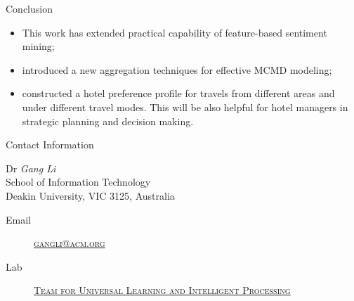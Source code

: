 \documentclass[
 size=12pt,
 paper=smartboard, %
 mode=present, %
 display=slides, %
 style=tulip,  %
 pauseslide,
 fleqn,leqno,clock]{powerdot}
\begin{document}
\begin{slide}[toc=,bm=]{Conclusion}
\begin{itemize}
\item This work has extended practical capability of feature-based sentiment mining; \pause

\item introduced a new aggregation techniques for effective MCMD modeling; \pause
 
\item constructed a hotel preference profile for travels from different areas and under different travel modes.
This will be also helpful for hotel managers in strategic planning and decision making.
\end{itemize}
\pause
\begin{center}
\textcolor{red}{\scalebox{1.5}{Questions?}}
\end{center}
\end{slide}


\begin{wideslide}[toc=,bm=]{Contact Information}
\centering
{}
\twocolumn[
lcolwidth=0.35\linewidth,
rcolwidth=0.65\linewidth
]
{
}
{
Dr \emph{Gang Li}\\
School of Information Technology\\
Deakin University, VIC 3125, Australia
\begin{description}
 \item[Email] \href{mailto:gangli@acm.org}
 {\textsc{\footnotesize{gangli@acm.org}}}
 
 \item[Lab] \href{http://www.tulip.org.au}
 {\textsc{\footnotesize{Team for Universal Learning and Intelligent Processing}}} 
\end{description}
} 
\end{wideslide}
\end{document}
